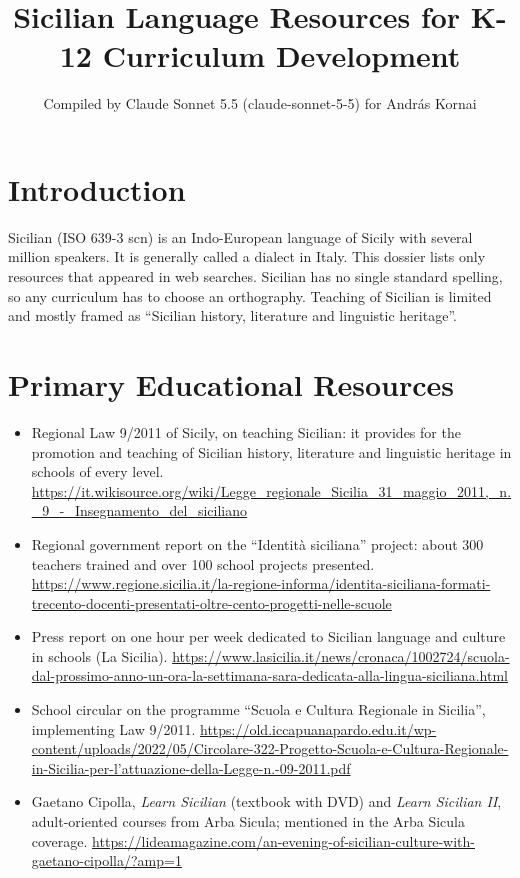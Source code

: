 \documentclass[12pt]{article}
\title{Sicilian Language Resources for K-12 Curriculum Development}
\author{Compiled by Claude Sonnet 5.5 (claude-sonnet-5-5) for Andr\'as Kornai}
\date{}
\begin{document}
\maketitle

\section{Introduction}
Sicilian (ISO 639-3 scn) is an Indo-European language of Sicily with several million speakers. It is generally called a dialect in Italy. This dossier lists only resources that appeared in web searches. Sicilian has no single standard spelling, so any curriculum has to choose an orthography. Teaching of Sicilian is limited and mostly framed as ``Sicilian history, literature and linguistic heritage''.

\section{Primary Educational Resources}
\begin{itemize}
\item Regional Law 9/2011 of Sicily, on teaching Sicilian: it provides for the promotion and teaching of Sicilian history, literature and linguistic heritage in schools of every level. \url{https://it.wikisource.org/wiki/Legge_regionale_Sicilia_31_maggio_2011,_n._9_-_Insegnamento_del_siciliano}
\item Regional government report on the ``Identit\`a siciliana'' project: about 300 teachers trained and over 100 school projects presented. \url{https://www.regione.sicilia.it/la-regione-informa/identita-siciliana-formati-trecento-docenti-presentati-oltre-cento-progetti-nelle-scuole}
\item Press report on one hour per week dedicated to Sicilian language and culture in schools (La Sicilia). \url{https://www.lasicilia.it/news/cronaca/1002724/scuola-dal-prossimo-anno-un-ora-la-settimana-sara-dedicata-alla-lingua-siciliana.html}
\item School circular on the programme ``Scuola e Cultura Regionale in Sicilia'', implementing Law 9/2011. \url{https://old.iccapuanapardo.edu.it/wp-content/uploads/2022/05/Circolare-322-Progetto-Scuola-e-Cultura-Regionale-in-Sicilia-per-l’attuazione-della-Legge-n.-09-2011.pdf}
\item Gaetano Cipolla, \emph{Learn Sicilian} (textbook with DVD) and \emph{Learn Sicilian II}, adult-oriented courses from Arba Sicula; mentioned in the Arba Sicula coverage. \url{https://lideamagazine.com/an-evening-of-sicilian-culture-with-gaetano-cipolla/?amp=1}
\end{itemize}
\end{document}
